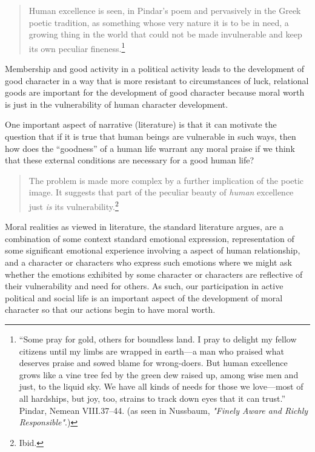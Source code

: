 \documentclass[phdthesis,12pt,final]{wuthesis}
\theoremstyle{definition}
\theoremstyle{definition}
\theoremstyle{definition}
\theoremstyle{definition}
\theoremstyle{remark}
\begin{document}
\begin{quote}
Human excellence is seen, in Pindar's poem and pervasively in the Greek poetic tradition, as something whose very nature it is to be in need, a growing thing in the world that could not be made invulnerable and keep its own peculiar fineness.\footnote{``Some pray for gold, others for boundless land. I pray to delight my fellow citizens until my limbs are wrapped in earth---a man who praised what deserves praise and sowed blame for wrong-doers. But human excellence grows like a vine tree fed by the green dew raised up, among wise men and just, to the liquid sky. We have all kinds of needs for those we love---most of all hardships, but joy, too, strains to track down eyes that it can trust.'' Pindar, Nemean VIII.37--44. (as seen in Nussbaum, \emph{"{Finely Aware} and {Richly Responsible}"}.)}
\end{quote}

Membership and good activity in a political activity leads to the development of good character in a way that is more resistant to circumstances of luck, relational goods are important for the development of good character because moral worth is just in the vulnerability of human character development.

One important aspect of narrative (literature) is that it can motivate the question that if it is true that human beings are vulnerable in such ways, then how does the ``goodness'' of a human life warrant any moral praise if we think that these external conditions are necessary for a good human life?

\begin{quote}
The problem is made more complex by a further implication of the poetic image. It suggests that part of the peculiar beauty of \emph{human} excellence just \emph{is} its vulnerability.\footnote{Ibid.}
\end{quote}

Moral realities as viewed in literature, the standard literature argues, are a combination of some context standard emotional expression, representation of some significant emotional experience involving a aspect of human relationship, and a character or characters who express such emotions where we might ask whether the emotions exhibited by some character or characters are reflective of their vulnerability and need for others. As such, our participation in active political and social life is an important aspect of the development of moral character so that our actions begin to have moral worth.
\end{document}
